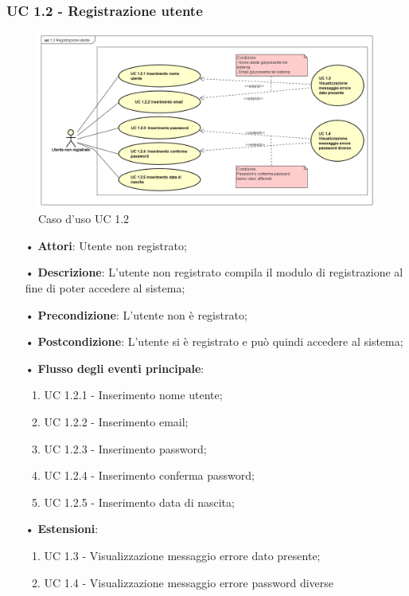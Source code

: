 \subsubsection{UC 1.2 - Registrazione utente}
\begin{figure}[H]
	\centering
	\includegraphics[width=17cm]{img/UC12.png} 
	\caption{Caso d'uso UC 1.2}\label{fig:12}
\end{figure}
\begin{itemize}
	\item[•]\textbf{Attori}: Utente non registrato;
	\item[•]\textbf{Descrizione}: L'utente non registrato compila il modulo di registrazione al fine di poter accedere al sistema;
	\item[•]\textbf{Precondizione}: L'utente non è registrato;
	\item[•]\textbf{Postcondizione}: L'utente si è registrato e può quindi accedere al sistema;
	\item[•]\textbf{Flusso degli eventi principale}:
	\begin{enumerate}
		\item UC 1.2.1 - Inserimento nome utente;
		\item UC 1.2.2 - Inserimento email;
		\item UC 1.2.3 - Inserimento password;
		\item UC 1.2.4 - Inserimento conferma password;
		\item UC 1.2.5 - Inserimento data di nascita;
	\end{enumerate}
	\item[•]\textbf{Estensioni}:
	\begin{enumerate}
		\item UC 1.3 - Visualizzazione messaggio errore dato presente;
		\item UC 1.4 - Visualizzazione messaggio errore password diverse
	\end{enumerate}
\end{itemize}

